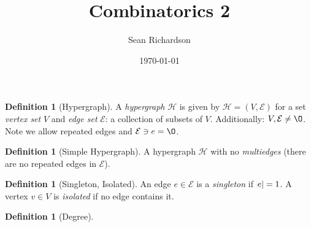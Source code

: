 \documentclass[12pt]{amsart}
\theoremstyle{definition}
\newtheorem{definition}[theorem]{Definition}
\newcommand{\cH}{\mathcal{H}}
\newcommand{\cE}{\mathcal{E}}
\begin{document}
\title{Combinatorics 2}
\author{Sean Richardson}
\date{\today}
\maketitle

\begin{definition}[Hypergraph]
    A \emph{hypergraph} $\cH$ is given by $\cH = (V,\cE)$ for a set
    \emph{vertex set} $V$ and \emph{edge set} $\cE$: a collection of subsets
    of $V$.  Additionally: $V,\cE \neq \O$. Note we allow repeated edges
    and $\cE \ni e = \O$.
\end{definition}
\begin{definition}[Simple Hypergraph]
    A hypergraph $\cH$ with no \emph{multiedges} (there are no repeated
    edges in $\cE$).
\end{definition}
\begin{definition}[Singleton, Isolated]
    An edge $e \in \cE$ is a \emph{singleton} if $\abs{e} = 1$. A vertex $v
    \in V$ is \emph{isolated} if no edge contains it.
\end{definition}
\begin{definition}[Degree]
    
\end{definition}
\end{document}
